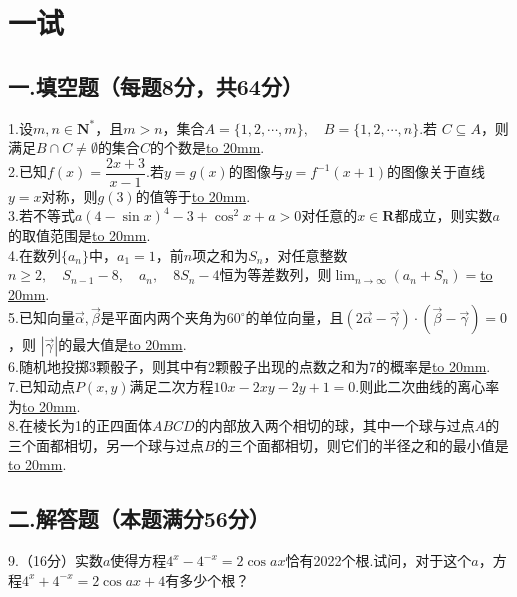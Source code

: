 \section*{一试}
\subsection*{一.填空题（每题8分，共64分）}

1.设$m,n\in \mathbf{N}^*$，且$m>n$，集合$A=\{1,2,\cdots,m\},\quad B=\{1,2,\cdots,n\}$.若
$C\subseteq A$，则满足$B\cap C\neq \emptyset$的集合$C$的个数是\underline{\hbox to 20mm{}}.
~\\

2.已知$f(x)=\dfrac{2x+3}{x-1}$.若$y=g(x)$的图像与$y=f^{-1}(x+1)$的图像关于直线$y=x$对称，则$g(3)$的值等于\underline{\hbox to 20mm{}}.
~\\

3.若不等式$a(4-\sin{x})^4-3+\cos^2{x}+a>0$对任意的$x\in \mathbf{R}$都成立，则实数$a$的取值范围是\underline{\hbox to 20mm{}}.
~\\

4.在数列$\{a_n\}$中，$a_1=1$，前$n$项之和为$S_n$，对任意整数$n\geq 2,\quad S_{n-1}-8,\quad a_n,\quad 8S_n-4$恒为等差数列，则$\displaystyle{\lim_{n\to \infty}(a_n+S_n)}=$\underline{\hbox to 20mm{}}.
~\\

5.已知向量$\vec{\alpha},\vec{\beta}$是平面内两个夹角为$60^{\circ}$的单位向量，且$(2\vec{\alpha}-\vec{\gamma})\cdot(\vec{\beta}-\vec{\gamma})=0$，则
$|\vec{\gamma}|$的最大值是\underline{\hbox to 20mm{}}.
~\\

6.随机地投掷3颗骰子，则其中有2颗骰子出现的点数之和为7的概率是\underline{\hbox to 20mm{}}.
~\\

7.已知动点$P(x,y)$满足二次方程$10x-2xy-2y+1=0$.则此二次曲线的离心率为\underline{\hbox to 20mm{}}.
~\\

8.在棱长为1的正四面体$ABCD$的内部放入两个相切的球，其中一个球与过点$A$的三个面都相切，另一个球与过点$B$的三个面都相切，则它们的半径之和的最小值是\underline{\hbox to 20mm{}}.
~\\

\subsection*{二.解答题（本题满分56分）}
9.（16分）实数$a$使得方程$4^x-4^{-x}=2\cos{ax}$恰有2022个根.试问，对于这个$a$，方程$4^x+4^{-x}=2\cos{ax}+4$有多少个根？

